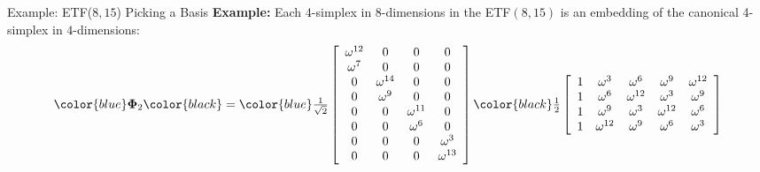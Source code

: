 \documentclass[12pt]{beamer}
\newcommand{\bfPhi}{\boldsymbol{\Phi}}
\begin{document}
\begin{frame}[noframenumbering]{Example: ETF($8,15$) Picking a Basis}
\textbf{Example:} Each $4$-simplex in $8$-dimensions in the ETF$(8,15)$ is an embedding of the canonical 4-simplex in $4$-dimensions:
\begin{equation*}
\color{blue}
\bfPhi_2
\color{black}
=
\color{blue}
\tfrac{1}{\sqrt{2}}\left[\begin{array}{cccc}
\omega^{12} & 0 & 0 & 0\\
	\omega^{7} & 0 & 0 & 0\\
	0 & \omega^{14} & 0 & 0\\
	0 & \omega^{9} & 0 & 0\\
	0 & 0 & \omega^{11} & 0\\
	0 & 0 & \omega^6 & 0\\
	0 & 0 & 0 & \omega^3\\
	0 & 0 & 0 & \omega^{13}
	\end{array}\right]
	\color{black}
	\tfrac{1}{2}\left[\begin{array}{ccccc}
    1 & \omega^{3} &\omega^{6} &\omega^{9} & \omega^{12}\\
    1 & \omega^{6} &\omega^{12} &\omega^{3} & \omega^{9}\\
    1 & \omega^{9} &\omega^{3} &\omega^{12} & \omega^{6}\\
    1 & \omega^{12} &\omega^{9} &\omega^{6} & \omega^{3}\\
    \end{array}\right]
\end{equation*}

\end{frame}
\end{document}
